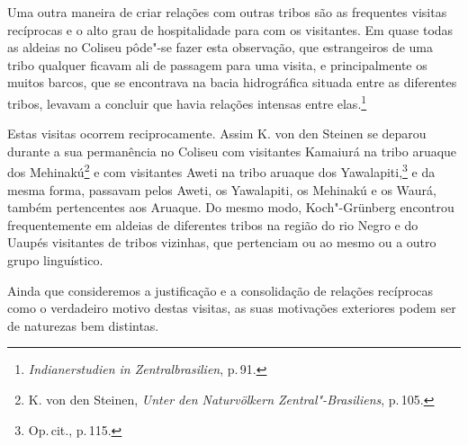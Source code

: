 Uma outra maneira de criar relações com outras tribos são as frequentes
visitas recíprocas e o alto grau de hospitalidade para com os
visitantes. Em quase todas as aldeias no Coliseu pôde"-se fazer esta
observação, que estrangeiros de uma tribo qualquer ficavam ali de
passagem para uma visita, e principalmente os muitos barcos, que se
encontrava na bacia hidrográfica situada entre as diferentes tribos,
levavam a concluir que havia relações intensas entre elas.\footnote{\textit{Indianerstudien
  in Zentralbrasilien}, p.\,91.}

Estas visitas ocorrem reciprocamente. Assim K. von den Steinen se
deparou durante a sua permanência no Coliseu com visitantes Kamaiurá na
tribo aruaque dos Mehinakú\footnote{K. von den Steinen, \textit{Unter den
  Naturvölkern Zentral"-Brasiliens}, p.\,105.} e com visitantes Aweti na
tribo aruaque dos Yawalapiti,\footnote{Op.\,cit., p.\,115.} e da mesma
forma, passavam pelos Aweti, os Yawalapiti, os Mehinakú e os Waurá,
também pertencentes aos Aruaque. Do mesmo modo, Koch"-Grünberg encontrou
frequentemente em aldeias de diferentes tribos na região do rio Negro e
do Uaupés visitantes de tribos vizinhas, que pertenciam ou ao mesmo ou a
outro grupo linguístico.

Ainda que consideremos a justificação e a consolidação de relações
recíprocas como o verdadeiro motivo destas visitas, as suas motivações
exteriores podem ser de naturezas bem distintas.


